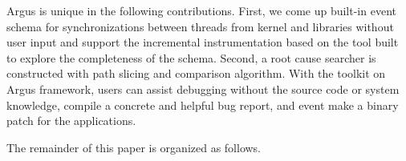 Argus is unique in the following contributions.
First, we come up built-in event schema for synchronizations between threads from kernel and libraries without user input and support the incremental instrumentation based on the tool built to explore the completeness of the schema.
Second, a root cause searcher is constructed with path slicing and comparison algorithm.
With the toolkit on Argus framework, users can assist debugging without the source code or system knowledge, compile a concrete and helpful bug report, and event make a binary patch for the applications.

The remainder of this paper is organized as follows.
